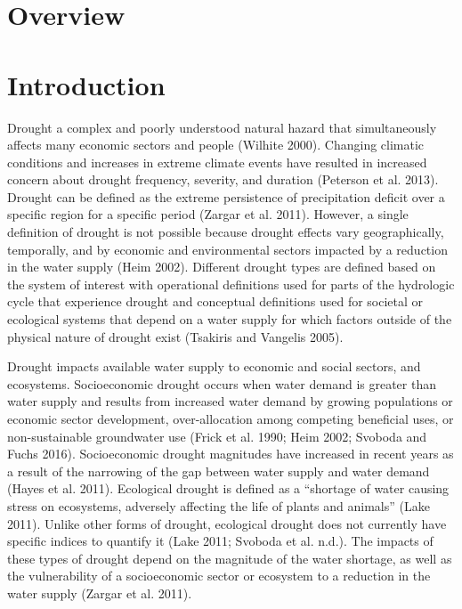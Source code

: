 \documentclass[12pt,twoside]{reedthesis}
\theoremstyle{definition}
\theoremstyle{definition}
\theoremstyle{definition}
\theoremstyle{remark}
\begin{document}
\section{Overview}\label{overview}

\section{Introduction}\label{introduction-1}

Drought a complex and poorly understood natural hazard that
simultaneously affects many economic sectors and people (Wilhite 2000).
Changing climatic conditions and increases in extreme climate events
have resulted in increased concern about drought frequency, severity,
and duration (Peterson et al. 2013). Drought can be defined as the
extreme persistence of precipitation deficit over a specific region for
a specific period (Zargar et al. 2011). However, a single definition of
drought is not possible because drought effects vary geographically,
temporally, and by economic and environmental sectors impacted by a
reduction in the water supply (Heim 2002). Different drought types are
defined based on the system of interest with operational definitions
used for parts of the hydrologic cycle that experience drought and
conceptual definitions used for societal or ecological systems that
depend on a water supply for which factors outside of the physical
nature of drought exist (Tsakiris and Vangelis 2005).

Drought impacts available water supply to economic and social sectors,
and ecosystems. Socioeconomic drought occurs when water demand is
greater than water supply and results from increased water demand by
growing populations or economic sector development, over-allocation
among competing beneficial uses, or non-sustainable groundwater use
(Frick et al. 1990; Heim 2002; Svoboda and Fuchs 2016). Socioeconomic
drought magnitudes have increased in recent years as a result of the
narrowing of the gap between water supply and water demand (Hayes et al.
2011). Ecological drought is defined as a ``shortage of water causing
stress on ecosystems, adversely affecting the life of plants and
animals'' (Lake 2011). Unlike other forms of drought, ecological drought
does not currently have specific indices to quantify it (Lake 2011;
Svoboda et al. n.d.). The impacts of these types of drought depend on
the magnitude of the water shortage, as well as the vulnerability of a
socioeconomic sector or ecosystem to a reduction in the water supply
(Zargar et al. 2011).
\end{document}
